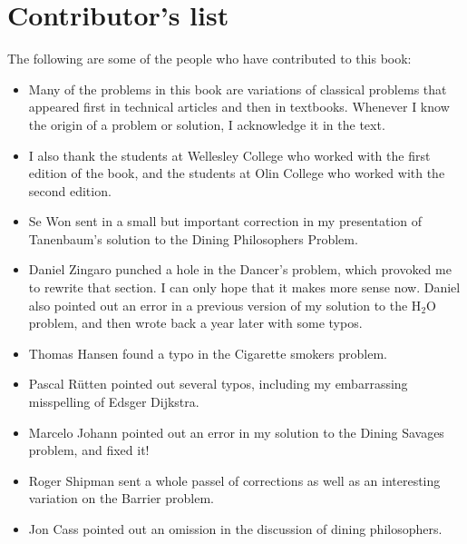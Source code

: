 \documentclass{book}
\begin{document}
\section*{Contributor's list}

The following are some of the people who have contributed to this
book:

\begin{itemize}

    \item Many of the problems in this book are variations of classical
          problems that appeared first in technical articles and then in textbooks.
          Whenever I know the origin of a problem or solution, I acknowledge it
          in the text.

    \item I also thank the students at Wellesley College who worked with
          the first edition of the book, and the students at Olin College who
          worked with the second edition.

    \item Se Won sent in a small but important correction in my presentation
          of Tanenbaum's solution to the Dining Philosophers Problem.

    \item Daniel Zingaro punched a hole in the Dancer's problem, which
          provoked me to rewrite that section.  I can only hope that it makes more
          sense now.  Daniel also pointed out an error in a previous version of
          my solution to the H$_2$O problem, and then wrote back a year later
          with some typos.

    \item Thomas Hansen found a typo in the Cigarette smokers problem.

    \item Pascal R\"{u}tten pointed out several typos, including my embarrassing
          misspelling of Edsger Dijkstra.

    \item Marcelo Johann pointed out an error in my solution to the
          Dining Savages problem, and fixed it!

    \item Roger Shipman sent a whole passel of corrections as well as
          an interesting variation on the Barrier problem.

    \item Jon Cass pointed out an omission in the discussion of dining
          philosophers.


\end{itemize}
\end{document}
